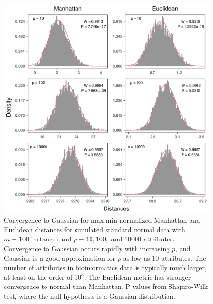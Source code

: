 \documentclass[10pt,letterpaper]{article}\usepackage[]{graphicx}\usepackage[]{color}
\begin{document}
\begin{figure}[H]
	\includegraphics[width=\textwidth]{central_limit_hist_normal_max-min.pdf}
	\caption{Convergence to Gaussian for max-min normalized Manhattan and Euclidean distances for simulated standard normal data with $m=100$ instances and $p=10, 100,$ and $10000$ attributes. Convergence to Gaussian occurs rapidly with increasing $p$, and Gaussian is a good approximation for $p$ as low as $10$ attributes. The number of attributes in bioinformatics data is typically much larger, at least on the order of $10^3$. The Euclidean metric has stronger convergence to normal than Manhattan.  P values from Shapiro-Wilk test, where the null hypothesis is a Gaussian distribution.}
\end{figure}
\end{document}
